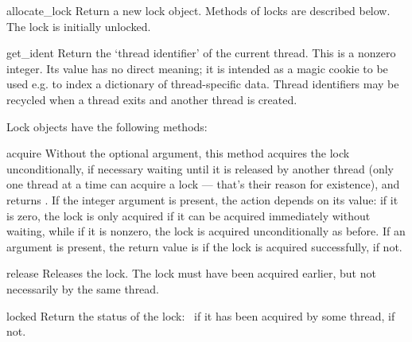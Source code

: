 
\begin{funcdesc}{allocate_lock}{}
Return a new lock object.  Methods of locks are described below.  The
lock is initially unlocked.
\end{funcdesc}

\begin{funcdesc}{get_ident}{}
Return the `thread identifier' of the current thread.  This is a
nonzero integer.  Its value has no direct meaning; it is intended as a
magic cookie to be used e.g. to index a dictionary of thread-specific
data.  Thread identifiers may be recycled when a thread exits and
another thread is created.
\end{funcdesc}


Lock objects have the following methods:

\begin{methoddesc}[lock]{acquire}{}
Without the optional argument, this method acquires the lock
unconditionally, if necessary waiting until it is released by another
thread (only one thread at a time can acquire a lock --- that's their
reason for existence), and returns .  If the integer
 argument is present, the action depends on its
value: if it is zero, the lock is only acquired if it can be acquired
immediately without waiting, while if it is nonzero, the lock is
acquired unconditionally as before.  If an argument is present, the
return value is  if the lock is acquired successfully,
 if not.
\end{methoddesc}

\begin{methoddesc}[lock]{release}{}
Releases the lock.  The lock must have been acquired earlier, but not
necessarily by the same thread.
\end{methoddesc}

\begin{methoddesc}[lock]{locked}{}
Return the status of the lock:\  if it has been acquired by
some thread,  if not.
\end{methoddesc}


